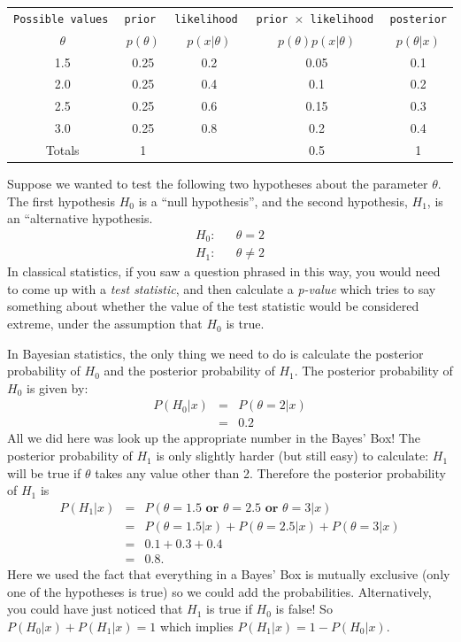 \begin{table}[h!]
\begin{center}
\begin{tabular}{|c|c|c|c|c|}
\hline
\tt{Possible values} & \tt{prior} & \tt{likelihood} & \tt{prior} $\times$ \tt{likelihood} & \tt{posterior}\\
$\theta$ & $p(\theta)$ & $p(x|\theta)$ & $p(\theta)p(x|\theta)$ & $p(\theta|x)$\\
\hline
1.5 & 0.25 & 0.2 & 0.05 & 0.1\\
2.0 & 0.25 & 0.4 & 0.1 & 0.2\\
2.5 & 0.25 & 0.6 & 0.15 & 0.3\\
3.0 & 0.25 & 0.8 & 0.2 & 0.4\\
\hline
Totals & 1 & & 0.5 & 1\\
\hline
\end{tabular}
\end{center}
\end{table}
Suppose we wanted to test the following two hypotheses about the parameter $\theta$.
The first hypothesis $H_0$ is a ``null hypothesis'', and the second hypothesis,
$H_1$, is an ``alternative hypothesis.
\begin{eqnarray}
H_0: && \theta = 2\\
H_1: && \theta \neq 2
\end{eqnarray}
In classical statistics, if you saw a question phrased in this way, you would
need to come up with a {\it test statistic},
and then calculate a {\it p-value} which tries to say something about whether
the value of the test statistic would be considered extreme, under the
assumption that $H_0$ is true.

In Bayesian statistics, the only thing we need to do is calculate
the posterior probability of $H_0$ and the posterior probability of $H_1$.
The posterior probability of $H_0$ is given by:
\begin{eqnarray}
P(H_0|x) &=& P(\theta = 2|x)\\
&=& 0.2
\end{eqnarray}
All we did here was look up the appropriate number in the Bayes' Box! The
posterior probability of $H_1$ is only slightly harder (but still easy)
to calculate: $H_1$ will
be true if $\theta$ takes any value other than 2. Therefore the posterior
probability of $H_1$ is
\begin{eqnarray}
P(H_1|x) &=& P(\theta = 1.5 \textbf{ or } \theta = 2.5 \textbf{ or } \theta = 3|x)\\
&=& P(\theta = 1.5|x) + P(\theta = 2.5|x) + P(\theta = 3|x)\\
&=& 0.1 + 0.3 + 0.4\\
&=& 0.8.
\end{eqnarray}
Here we used the fact that everything in a Bayes' Box is mutually exclusive
(only one of the hypotheses is true) so we could add the probabilities.
Alternatively, you could have just noticed that $H_1$ is true if $H_0$ is false!
So $P(H_0|x) + P(H_1|x) = 1$ which implies $P(H_1|x) = 1 - P(H_0|x)$.

